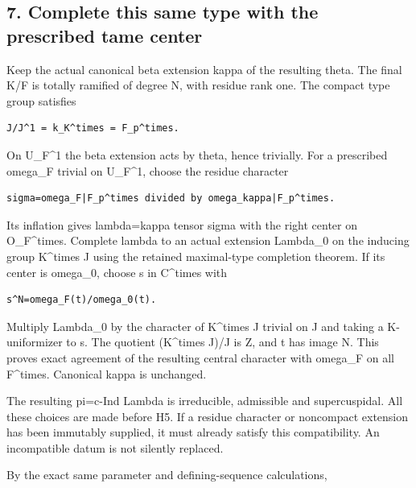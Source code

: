 \hypertarget{odd_character-complete-this-same-type-with-the-prescribed-tame-center}{%
\subsection{7. Complete this same type with the prescribed tame
center}\label{odd_character-complete-this-same-type-with-the-prescribed-tame-center}}

Keep the actual canonical beta extension kappa of the resulting theta.
The final K/F is totally ramified of degree N, with residue rank one.
The compact type group satisfies

\begin{Verbatim}[fontsize=\small,breaklines=true,breakanywhere=true]
J/J^1 = k_K^times = F_p^times.
\end{Verbatim}

On U\_F\^{}1 the beta extension acts by theta, hence trivially. For a
prescribed omega\_F trivial on U\_F\^{}1, choose the residue character

\begin{Verbatim}[fontsize=\small,breaklines=true,breakanywhere=true]
sigma=omega_F|F_p^times divided by omega_kappa|F_p^times.
\end{Verbatim}

Its inflation gives lambda=kappa tensor sigma with the right center on
O\_F\^{}times. Complete lambda to an actual extension Lambda\_0 on the
inducing group K\^{}times J using the retained maximal-type completion
theorem. If its center is omega\_0, choose s in C\^{}times with

\begin{Verbatim}[fontsize=\small,breaklines=true,breakanywhere=true]
s^N=omega_F(t)/omega_0(t).
\end{Verbatim}

Multiply Lambda\_0 by the character of K\^{}times J trivial on J and
taking a K-uniformizer to s. The quotient (K\^{}times J)/J is Z, and t has image N. This proves exact agreement of the resulting central
character with omega\_F on all F\^{}times. Canonical kappa is unchanged.

The resulting pi=c-Ind Lambda is irreducible, admissible and
supercuspidal. All these choices are made before H5. If a residue
character or noncompact extension has been immutably supplied, it must already satisfy this compatibility. An incompatible datum is not silently replaced.

By the exact same parameter and defining-sequence calculations,

